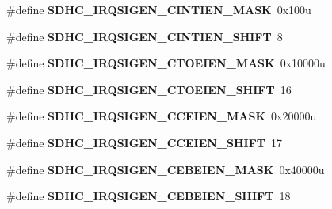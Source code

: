 \begin{DoxyCompactItemize}
\item 
\#define {\bfseries S\+D\+H\+C\+\_\+\+I\+R\+Q\+S\+I\+G\+E\+N\+\_\+\+C\+I\+N\+T\+I\+E\+N\+\_\+\+M\+A\+SK}~0x100u\hypertarget{group__SDHC__Register__Masks_gad9ffbe51e814a8ece8a5c12e0ebd0ba3}{}\label{group__SDHC__Register__Masks_gad9ffbe51e814a8ece8a5c12e0ebd0ba3}

\item 
\#define {\bfseries S\+D\+H\+C\+\_\+\+I\+R\+Q\+S\+I\+G\+E\+N\+\_\+\+C\+I\+N\+T\+I\+E\+N\+\_\+\+S\+H\+I\+FT}~8\hypertarget{group__SDHC__Register__Masks_ga5dabd6ab59c1c4ab26de59aae2c42235}{}\label{group__SDHC__Register__Masks_ga5dabd6ab59c1c4ab26de59aae2c42235}

\item 
\#define {\bfseries S\+D\+H\+C\+\_\+\+I\+R\+Q\+S\+I\+G\+E\+N\+\_\+\+C\+T\+O\+E\+I\+E\+N\+\_\+\+M\+A\+SK}~0x10000u\hypertarget{group__SDHC__Register__Masks_ga244279ea7f9e5ef02942b303764ea87f}{}\label{group__SDHC__Register__Masks_ga244279ea7f9e5ef02942b303764ea87f}

\item 
\#define {\bfseries S\+D\+H\+C\+\_\+\+I\+R\+Q\+S\+I\+G\+E\+N\+\_\+\+C\+T\+O\+E\+I\+E\+N\+\_\+\+S\+H\+I\+FT}~16\hypertarget{group__SDHC__Register__Masks_gab06cfed0d752fd51ab5e2eea99832192}{}\label{group__SDHC__Register__Masks_gab06cfed0d752fd51ab5e2eea99832192}

\item 
\#define {\bfseries S\+D\+H\+C\+\_\+\+I\+R\+Q\+S\+I\+G\+E\+N\+\_\+\+C\+C\+E\+I\+E\+N\+\_\+\+M\+A\+SK}~0x20000u\hypertarget{group__SDHC__Register__Masks_ga3d875f5185d1fb805a87aa0c0737ded7}{}\label{group__SDHC__Register__Masks_ga3d875f5185d1fb805a87aa0c0737ded7}

\item 
\#define {\bfseries S\+D\+H\+C\+\_\+\+I\+R\+Q\+S\+I\+G\+E\+N\+\_\+\+C\+C\+E\+I\+E\+N\+\_\+\+S\+H\+I\+FT}~17\hypertarget{group__SDHC__Register__Masks_ga2bc72b9a24dfa8dbae34157775b493c7}{}\label{group__SDHC__Register__Masks_ga2bc72b9a24dfa8dbae34157775b493c7}

\item 
\#define {\bfseries S\+D\+H\+C\+\_\+\+I\+R\+Q\+S\+I\+G\+E\+N\+\_\+\+C\+E\+B\+E\+I\+E\+N\+\_\+\+M\+A\+SK}~0x40000u\hypertarget{group__SDHC__Register__Masks_ga200f2b394bdfd0e097f4ad4c496ff2d6}{}\label{group__SDHC__Register__Masks_ga200f2b394bdfd0e097f4ad4c496ff2d6}

\item 
\#define {\bfseries S\+D\+H\+C\+\_\+\+I\+R\+Q\+S\+I\+G\+E\+N\+\_\+\+C\+E\+B\+E\+I\+E\+N\+\_\+\+S\+H\+I\+FT}~18\hypertarget{group__SDHC__Register__Masks_ga1b7ce68e7e1e9354fd70b85ffe1625a1}{}\label{group__SDHC__Register__Masks_ga1b7ce68e7e1e9354fd70b85ffe1625a1}


\end{DoxyCompactItemize}
